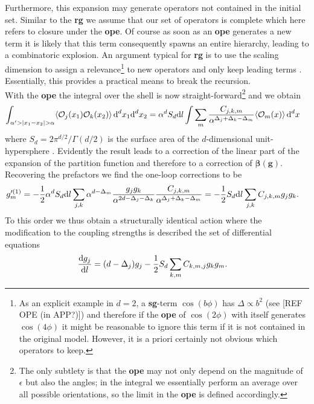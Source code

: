 \documentclass[english, parskip=full]{scrartcl}
\renewcommand{\gls}[1]{\textbf{#1}}
\newcommand{\rgbeta}{\bm{\beta}}
\begin{document}
Furthermore, this expansion may generate operators not contained in the initial set.
Similar to the \tms{} \gls{rg} we assume that our set of operators is complete which here refers to closure under the \gls{ope}.
Of course as soon as an \gls{ope} generates a new term it is likely that this term consequently spawns an entire hierarchy, leading to a combinatoric explosion.
An argument typical for \gls{rg} is to use the scaling dimension to assign a relevance\footnote{As an explicit example in $d=2$, a \gls{sg}-term $\cos(b\phi)$ has $\Delta \propto b^2$ (see [REF OPE  (in APP?)]) and therefore if the \gls{ope} of $\cos(2\phi)$ with itself generates $\cos(4\phi)$ it might be reasonable to ignore this term if it is not contained in the original model. However, it is a priori certainly not obvious which operators to keep.} to new operators and only keep leading terms \cite[]{AltlandSimons}.
Essentially, this provides a practical means to break the recursion.\\
With the \gls{ope} the integral over the shell is now straight-forward\footnote{The only subtlety is that the \gls{ope} may not only depend on the magnitude of $\epsilon$ but also the angles; in the integral we essentially perform an average over all possible orientations, so the limit in the \gls{ope} is defined accordingly.} and we obtain
\begin{align*}
\int_{\alpha'>|x_1-x_2|>\alpha} \bra*{\mathcal{O}_j(x_1) \mathcal{O}_k(x_2)}\,\d^dx_1 \d^dx_2 &= \alpha^d S_d \d l \int \sum_m \frac{C_{j,k,m}}{\alpha^{\Delta_j + \Delta_k - \Delta_m}} \bra*{\mathcal{O}_m(x)}\,\d^dx
\end{align*}
where $S_d = 2\pi^{d/2} / \Gamma(d/2)$ is the surface area of the $d$-dimensional unit-hypersphere \cite[]{Cardy_1996}.
Evidently the result leads to a correction of the linear part of the expansion of the partition function and therefore to a correction of $\rgbeta(\textbf{g})$.
Recovering the prefactors we find the one-loop corrections to be
\begin{align*}
g_m'^{(1)} &= -\frac{1}{2} \alpha^d S_d \text{d} l \sum_{j,k} \alpha^{d-\Delta_m} \frac{g_jg_k}{\alpha^{2d-\Delta_j - \Delta_k}} \frac{C_{j,k,m}}{\alpha^{\Delta_j + \Delta_k - \Delta_m}} = -\frac{1}{2} S_d\text{d} l \sum_{j,k} C_{j,k,m} g_jg_k.
\end{align*}
To this order we thus obtain a structurally identical action where the modification to the coupling strengths is described the set of differential equations
\begin{align}
\frac{\text{d} g_j}{\text{d} l} &= (d - \Delta_j) g_j - \frac{1}{2} S_d \sum_{k,m} C_{k,m,j} g_kg_m. \label{eqn:rg:beta_function_1loop}
\end{align}
\end{document}
